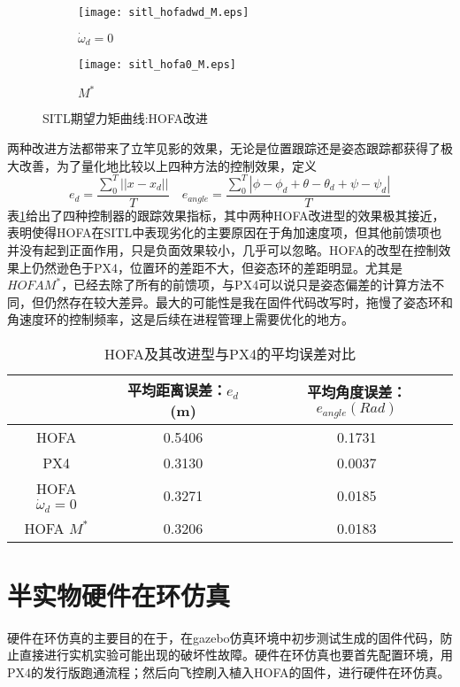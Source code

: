 \begin{figure}[H]
  \centering
\begin{subfigure}[b]{0.49\linewidth}
    \texttt{[image: sitl\_hofadwd\_M.eps]}
    \caption{$\dot \omega_d =0$}
\end{subfigure}
\hfill
\begin{subfigure}[b]{0.49\linewidth}
    \texttt{[image: sitl\_hofa0\_M.eps]}
    \caption{$M^*$}
\end{subfigure}
\caption{SITL期望力矩曲线:HOFA改进}
\label{SITL期望力矩曲线:HOFA改进}
\end{figure}

两种改进方法都带来了立竿见影的效果，无论是位置跟踪还是姿态跟踪都获得了极大改善，为了量化地比较以上四种方法的控制效果，定义
$$e_d=\frac{\sum_0^{T}||x-x_d||}{T} \quad e_{angle}=\frac{\sum_0^{T}|\phi-\phi_d+\theta-\theta_d+\psi-\psi_d|}{T}$$
表\ref{HOFA改}给出了四种控制器的跟踪效果指标，其中两种HOFA改进型的效果极其接近，表明使得HOFA在SITL中表现劣化的主要原因在于角加速度项，但其他前馈项也并没有起到正面作用，只是负面效果较小，几乎可以忽略。HOFA的改型在控制效果上仍然逊色于PX4，位置环的差距不大，但姿态环的差距明显。尤其是$HOFA M^*$，已经去除了所有的前馈项，与PX4可以说只是姿态偏差的计算方法不同，但仍然存在较大差异。最大的可能性是我在固件代码改写时，拖慢了姿态环和角速度环的控制频率，这是后续在进程管理上需要优化的地方。
\begin{table}[H]
  \centering
  \caption{HOFA及其改进型与PX4的平均误差对比}
  \label{HOFA改}
  \begin{tabular}{ccc}
      \toprule
      & 平均距离误差：$e_d$ (m)& 平均角度误差：$e_{angle}(Rad)$  \\
      \midrule
      HOFA &0.5406  & 0.1731\\
      PX4 & 0.3130 &  0.0037\\
      HOFA $\dot \omega_d=0$ & 0.3271 & 0.0185\\
      HOFA $M^*$ &0.3206  & 0.0183\\
      \bottomrule
  \end{tabular}
\end{table}

\section{半实物硬件在环仿真}
硬件在环仿真的主要目的在于，在gazebo仿真环境中初步测试生成的固件代码，防止直接进行实机实验可能出现的破坏性故障。硬件在环仿真也要首先配置环境，用PX4的发行版跑通流程；然后向飞控刷入植入HOFA的固件，进行硬件在环仿真。
